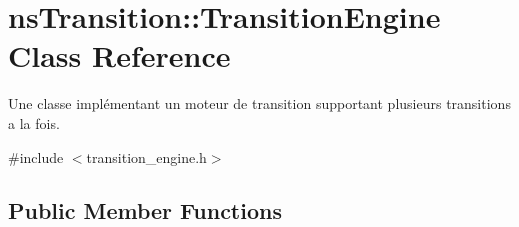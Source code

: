 \hypertarget{classns_transition_1_1_transition_engine}{}\section{ns\+Transition\+:\+:Transition\+Engine Class Reference}
\label{classns_transition_1_1_transition_engine}


Une classe implémentant un moteur de transition supportant plusieurs transitions a la fois.  




{\ttfamily \#include $<$transition\+\_\+engine.\+h$>$}

\subsection*{Public Member Functions}
